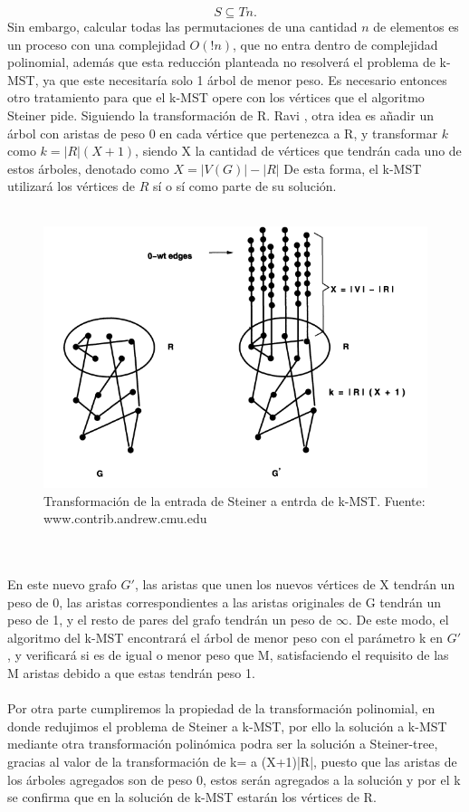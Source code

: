 \documentclass[spanish,12pt]{elsarticle}
\begin{document}
\[
S \subseteq Tn.
\]
Sin embargo, calcular todas las permutaciones de una cantidad $n$ de elementos es un proceso con una complejidad $O(!n)$, que no entra dentro de complejidad polinomial, además que esta reducción planteada no resolverá el problema de k-MST, ya que este necesitaría solo 1 árbol de menor peso. Es necesario entonces otro tratamiento para que el k-MST opere con los vértices que el algoritmo Steiner pide. Siguiendo la transformación de R. Ravi \cite{4}, otra idea es añadir un árbol con aristas de peso 0 en cada vértice que pertenezca a R, y transformar $k$ como $k = |R|(X+1)$, siendo X la cantidad de vértices que tendrán cada uno de estos árboles, denotado como $X = |V(G)|-|R|$ De esta forma, el k-MST utilizará los vértices de $R$ sí o sí como parte de su solución.
\\\\ 
\begin{figure}[h]
    \centering
    \includegraphics[scale=0.65]{images/graph_explicacion.png}
    \caption{Transformación de la entrada de Steiner a entrda de k-MST. Fuente: www.contrib.andrew.cmu.edu }
    \label{fig:my_label}
\end{figure}
\\\\
En este nuevo grafo $G'$, las aristas que unen los nuevos vértices de X tendrán un peso de 0, las aristas correspondientes a las aristas originales de G tendrán un peso de 1, y el resto de pares del grafo tendrán un peso de $\infty$. De este modo, el algoritmo del k-MST encontrará el árbol de menor peso con el parámetro k en $G'$, y verificará si es de igual o menor peso que M, satisfaciendo el requisito de las M aristas debido a que estas tendrán peso 1.\\\\
Por otra parte cumpliremos la propiedad de la transformación polinomial, en donde redujimos el problema de Steiner a k-MST, por ello la solución a k-MST mediante otra transformación polinómica podra ser la solución a Steiner-tree, gracias al valor de la transformación de k= a (X+1)|R|, puesto que las aristas de los árboles agregados son de peso 0, estos serán agregados a la solución y por el k se confirma que en la solución de k-MST estarán los vértices de R.
\end{document}
